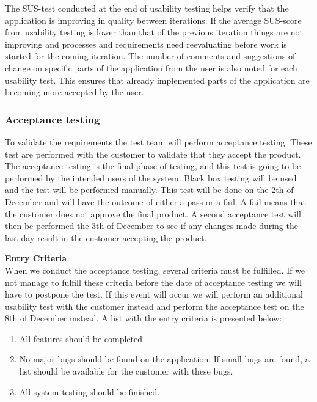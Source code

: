 \noindent The SUS-test conducted at the end of usability testing helps verify that the application is improving in quality between iterations. If the average SUS-score from usability testing is lower than that of the previous iteration things are not improving and processes and requirements need reevaluating before work is started for the coming iteration. The number of comments and suggestions of change on specific parts of the application from the user is also noted for each usability test. This ensures that already implemented parts of the application are becoming more accepted by the user.\\

\subsubsection{Acceptance testing}
To validate the requirements the test team will perform acceptance testing. These test are performed with the customer to validate that they accept the product. The acceptance testing is the final phase of testing, and this test is going to be performed by the intended users of the system. Black box testing will be used and the test will be performed manually. This test will be done on the 2th of December and will have the outcome of either a pass or a fail. A fail means that the customer does not approve the final product. A second acceptance test will then be performed the 3th of December to see if any changes made during the last day result in the customer accepting the product. \newline

\noindent \textbf{Entry Criteria}\\
When we conduct the acceptance testing, several criteria must be fulfilled. If we not manage to fulfill these criteria before the date of acceptance testing we will have to postpone the test. If this event will occur we will perform an additional usability test with the customer instead and perform the acceptance test on the 8th of December instead. A list with the entry criteria is presented below:
\begin{enumerate}
    \item All features should be completed
    \item No major bugs should be found on the application. If small bugs are found, a list should be available for the customer with these bugs.
    \item All system testing should be finished.
\end{enumerate}

